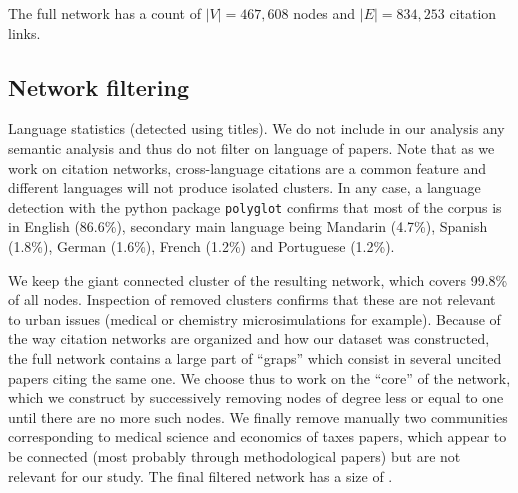 The full network has a count of $\left|V\right|= 467,608$ nodes and $\left|E\right|=834,253$ citation links. 


\subsection*{Network filtering}

Language statistics (detected using titles). We do not include in our analysis any semantic analysis and thus do not filter on language of papers. Note that as we work on citation networks, cross-language citations are a common feature and different languages will not produce isolated clusters. In any case, a language detection with the python package \texttt{polyglot} confirms that most of the corpus is in English (86.6\%), secondary main language being Mandarin (4.7\%), Spanish (1.8\%), German (1.6\%), French (1.2\%) and Portuguese (1.2\%).





We keep the giant connected cluster of the resulting network, which covers 99.8\% of all nodes.
 Inspection of removed clusters confirms that these are not relevant to urban issues (medical or chemistry microsimulations for example). Because of the way citation networks are organized and how our dataset was constructed, the full network contains a large part of ``graps'' which consist in several uncited papers citing the same one. We choose thus to work on the ``core'' of the network, which we construct by successively removing nodes of degree less or equal to one until there are no more such nodes. We finally remove manually two communities corresponding to medical science and economics of taxes papers, which appear to be connected (most probably through methodological papers) but are not relevant for our study. The final filtered network has a size of %
  .


